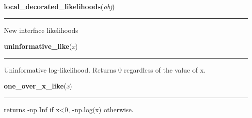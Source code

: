     \label{pymc:distributions:local_decorated_likelihoods}

    \vspace{0.5ex}

    \begin{boxedminipage}{\textwidth}

    \raggedright \textbf{local\_decorated\_likelihoods}(\textit{obj})

    \vspace{-1.5ex}

    \rule{\textwidth}{0.5\fboxrule}

New interface likelihoods
    \vspace{1ex}

    \end{boxedminipage}

    \label{pymc:distributions:uninformative_like}

    \vspace{0.5ex}

    \begin{boxedminipage}{\textwidth}

    \raggedright \textbf{uninformative\_like}(\textit{x})

    \vspace{-1.5ex}

    \rule{\textwidth}{0.5\fboxrule}

Uninformative log-likelihood. Returns 0 regardless of the value of x.
    \vspace{1ex}

    \end{boxedminipage}

    \label{pymc:distributions:one_over_x_like}

    \vspace{0.5ex}

    \begin{boxedminipage}{\textwidth}

    \raggedright \textbf{one\_over\_x\_like}(\textit{x})

    \vspace{-1.5ex}

    \rule{\textwidth}{0.5\fboxrule}

returns -np.Inf if x{\textless}0, -np.log(x) otherwise.
    \vspace{1ex}

    \end{boxedminipage}


